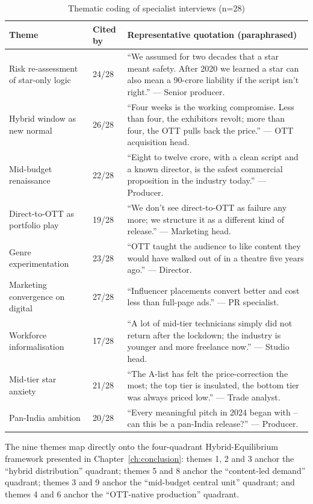 \begin{table}[h]
\centering
\caption{Thematic coding of specialist interviews (n=28)}
\label{tab:themes}
\small
\begin{tabular}{p{3.5cm} p{1.4cm} p{9.5cm}}
\toprule
\textbf{Theme} & \textbf{Cited by} & \textbf{Representative quotation (paraphrased)}\\
\midrule
Risk re-assessment of star-only logic & 24/28 &
``We assumed for two decades that a star meant safety.  After 2020
we learned a star can also mean a 90-crore liability if the script
isn't right.''  --- Senior producer.\\
Hybrid window as new normal & 26/28 &
``Four weeks is the working compromise.  Less than four, the
exhibitors revolt; more than four, the OTT pulls back the price.''
--- OTT acquisition head.\\
Mid-budget renaissance & 22/28 &
``Eight to twelve crore, with a clean script and a known director,
is the safest commercial proposition in the industry today.''
--- Producer.\\
Direct-to-OTT as portfolio play & 19/28 &
``We don't see direct-to-OTT as failure any more; we structure
it as a different kind of release.''  --- Marketing head.\\
Genre experimentation & 23/28 &
``OTT taught the audience to like content they would have walked
out of in a theatre five years ago.''  --- Director.\\
Marketing convergence on digital & 27/28 &
``Influencer placements convert better and cost less than full-page
ads.''  --- PR specialist.\\
Workforce informalisation & 17/28 &
``A lot of mid-tier technicians simply did not return after the
lockdown; the industry is younger and more freelance now.''
--- Studio head.\\
Mid-tier star anxiety & 21/28 &
``The A-list has felt the price-correction the most; the top tier
is insulated, the bottom tier was always priced low.''
--- Trade analyst.\\
Pan-India ambition & 20/28 &
``Every meaningful pitch in 2024 began with -- can this be a pan-India
release?''  --- Producer.\\
\bottomrule
\end{tabular}
\end{table}

The nine themes map directly onto the four-quadrant Hybrid-Equilibrium
framework presented in Chapter~\ref{ch:conclusion}: themes 1, 2 and
3 anchor the ``hybrid distribution'' quadrant; themes 5 and 8 anchor
the ``content-led demand'' quadrant; themes 3 and 9 anchor the
``mid-budget central unit'' quadrant; and themes 4 and 6 anchor the
``OTT-native production'' quadrant.

